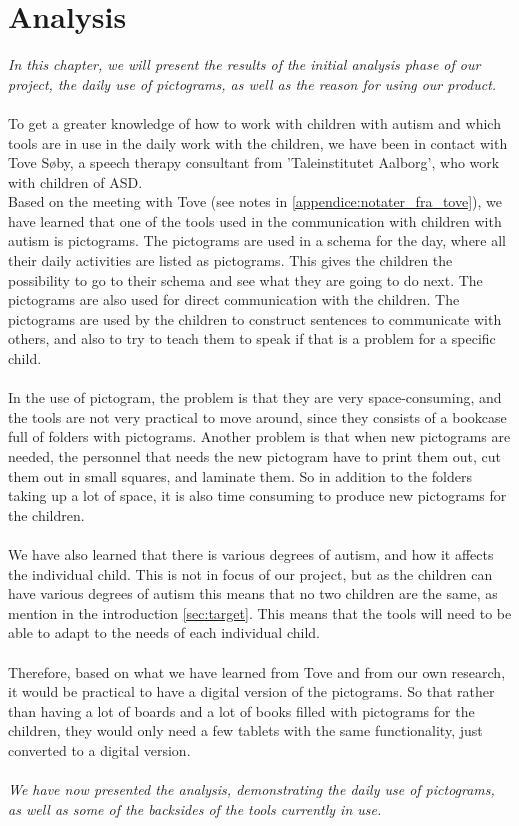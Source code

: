 \chapter{Analysis}

\textit{In this chapter, we will present the results of the initial analysis phase of our project, the daily use of pictograms, as well as the reason for using our product.}\\
\\
To get a greater knowledge of how to work with children with autism and which tools are in use in the daily work with the children, we have been in contact with  Tove S\o{}by, a speech therapy consultant from 'Taleinstitutet Aalborg', who work with children of ASD.\\ 

Based on the meeting with Tove (see notes in \autoref{appendice:notater_fra_tove}), we have learned that one of the tools used in the communication with children with autism is pictograms.
The pictograms are used in a schema for the day, where all their daily activities are listed as pictograms.
This gives the children the possibility to go to their schema and see what they are going to do next. 
The pictograms are also used for direct communication with the children. The pictograms are used by the children to construct sentences to communicate with others, and also to try to teach them to speak if that is a problem for a specific child.\\
\\
In the use of pictogram, the problem is that they are very space-consuming, and the tools are not very practical to move around, since they consists of a bookcase full of folders with pictograms. 
Another problem is that when new pictograms are needed, the personnel that needs the new pictogram have to print them out, cut them out in small squares, and laminate them. 
So in addition to the folders taking up a lot of space, it is also time consuming to produce new pictograms for the children.\\ 
\\
We have also learned that there is various degrees of autism, and how it affects the individual child. 
This is not in focus of our project, but as the children can have various degrees of autism this means that no two children are the same, as mention in the introduction \autoref{sec:target}. 
This means that the tools will need to be able to adapt to the needs of each individual child.\\
\\ 
Therefore, based on what we have learned from Tove and from our own research, it would be practical to have a digital version of the pictograms. So that rather than having a lot of boards and a lot of books filled with pictograms for the children, they would only need a few tablets with the same functionality, just converted to a digital version.\\
\\
\textit{We have now presented the analysis, demonstrating the daily use of pictograms, as well as some of the backsides of the tools currently in use. }